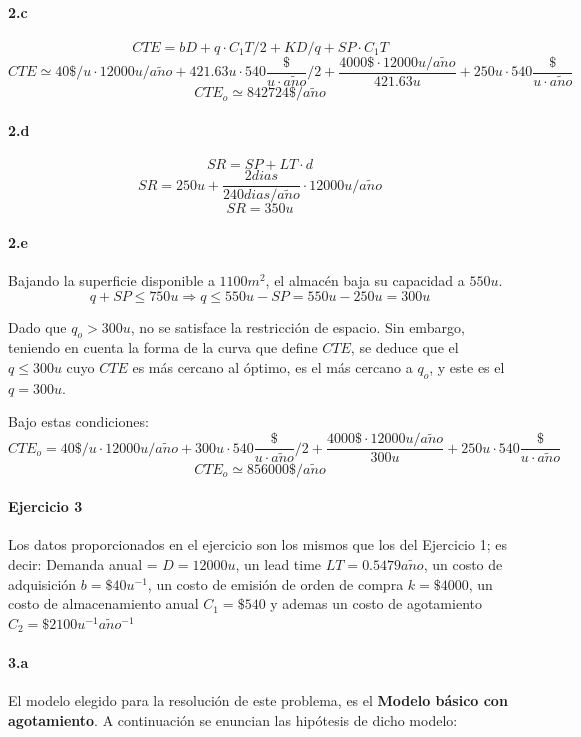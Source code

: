 \documentclass{article}
\def \anio {a\tilde{n}o}
\begin{document}
  \paragraph{2.c}
        $$ CTE = b D + q \cdot C_1 T / 2 + K D / q + SP \cdot C_1 T $$
        $$ CTE \simeq 40\$/u \cdot 12000u/\anio + 421.63u \cdot 540\frac{\$}{u\cdot\anio} / 2 + \frac{4000\$ \cdot 12000u/\anio}{421.63u} + 250u \cdot 540\frac{\$}{u\cdot\anio}$$
        $$ \boxed{ CTE_o \simeq 842724\$/\anio } $$


  \paragraph{2.d}
        $$ SR = SP + LT \cdot d $$
        $$ SR = 250u + \frac{2 dias}{240dias/\anio} \cdot 12000u/\anio $$
        $$ \boxed{ SR = 350u } $$

  \paragraph{2.e}
    Bajando la superficie disponible a $1100m^2$, el almacén baja su capacidad a $550u$.
    $$ q + SP \le 750u \Rightarrow q \le 550u - SP = 550u - 250u = 300u $$

    Dado que $q_o > 300u$, no se satisface la restricción de espacio. Sin embargo, teniendo en cuenta la forma de la curva que define $CTE$, se deduce que el $q \le 300u$ cuyo $CTE$ es más cercano al óptimo, es el más cercano a $q_o$, y este es el $q = 300u$.

    Bajo estas condiciones:
        $$ CTE_o = 40\$/u \cdot 12000u/\anio + 300u \cdot 540\frac{\$}{u\cdot\anio} / 2 + \frac{4000\$ \cdot 12000u/\anio}{300u} + 250u \cdot 540\frac{\$}{u\cdot\anio}$$
        $$ \boxed{ CTE_o \simeq 856000\$/\anio } $$


\paragraph{Ejercicio 3}

Los datos proporcionados en el ejercicio son los mismos que los del Ejercicio 1; es decir:
Demanda anual = $ D = 12000 u $, un lead time $ LT = 0.5479 \anio $, un costo de adquisici\'on $ b = \$40 u^{-1} $, un costo de emisi\'on de orden de compra $ k = \$4000 $, 
un costo de almacenamiento anual $ C_1 = \$540 $ y ademas un costo de agotamiento $ C_2 = \$2100 u^{-1}\anio^{-1} $

  \paragraph{3.a}
   El modelo elegido para la resoluci\'on de este problema, es el {\bf Modelo b\'asico con agotamiento}. A continuaci\'on se enuncian las hip\'otesis de dicho modelo:
\end{document}
